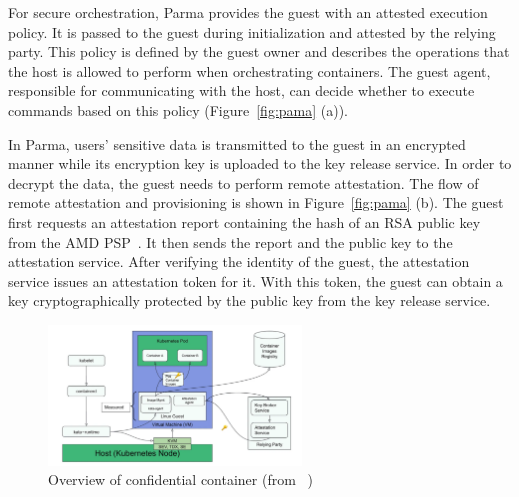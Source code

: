 For secure orchestration, Parma provides the guest with an attested execution policy. It is passed to the guest during initialization and attested by the relying party. This policy is defined by the guest owner and describes the operations that the host is allowed to perform when orchestrating 
containers. The guest agent, responsible for communicating with the host, can decide whether to execute commands based on this policy (Figure~\ref{fig:pama} (a)).  


In Parma, users' sensitive data is transmitted to the guest in an encrypted manner while its encryption key is uploaded to the key release service. In order to decrypt the data, the guest needs to perform remote attestation. The flow of remote attestation and provisioning 
is shown in Figure~\ref{fig:pama} (b). The guest first requests an attestation report containing the hash of an RSA public key from the AMD PSP~\cite*{snp_firmware}. It then sends the report and the public key to the attestation service. After verifying the identity of the guest, 
the attestation service issues an attestation token for it. With this token, the guest can obtain a key cryptographically protected by the public key from the key release service.

 
\begin{figure}[htp]
    \centering
    \includegraphics[width=0.6\textwidth]{images/confidentail_kata.png}
    \caption[Overview of confidential container]{Overview of confidential container (from ~\cite*{confidential_kata})}
    \label{fig:confidentail_kata}
\end{figure}

